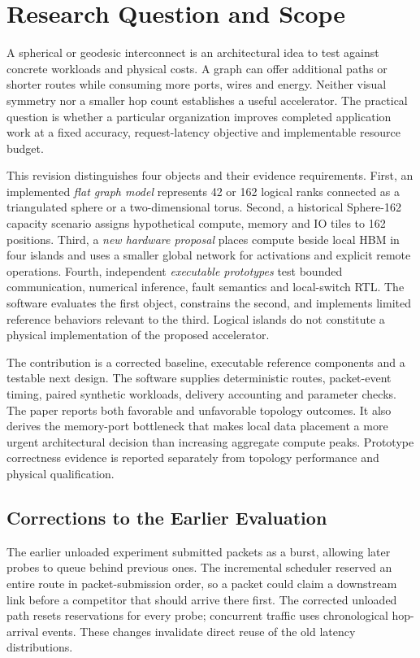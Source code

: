 \documentclass[11pt,a4paper]{article}
\begin{document}
\section{Research Question and Scope}\label{sec:scope}

A spherical or geodesic interconnect is an architectural idea to test against
concrete workloads and physical costs. A graph can offer additional paths or
shorter routes while consuming more ports, wires and energy. Neither visual
symmetry nor a smaller hop count establishes a useful accelerator. The
practical question is whether a particular organization improves completed
application work at a fixed accuracy, request-latency objective and
implementable resource budget.

This revision distinguishes four objects and their evidence requirements.
First, an implemented \emph{flat graph model} represents 42 or 162 logical
ranks connected as a triangulated sphere or a two-dimensional torus. Second,
a historical Sphere-162 capacity scenario assigns hypothetical compute,
memory and IO tiles to 162 positions. Third, a \emph{new hardware proposal}
places compute beside local HBM in four islands and uses a smaller global
network for activations and explicit remote operations. Fourth, independent
\emph{executable prototypes} test bounded communication, numerical inference,
fault semantics and local-switch RTL. The software evaluates the first object,
constrains the second, and implements limited reference behaviors relevant to
the third. Logical islands do not constitute a physical implementation of the
proposed accelerator.

The contribution is a corrected baseline, executable reference components and
a testable next design. The software supplies deterministic routes,
packet-event timing, paired
synthetic workloads, delivery accounting and parameter checks. The paper
reports both favorable and unfavorable topology outcomes. It also derives
the memory-port bottleneck that makes local data placement a more urgent
architectural decision than increasing aggregate compute peaks. Prototype
correctness evidence is reported separately from topology performance and
physical qualification.

\subsection{Corrections to the Earlier Evaluation}

The earlier unloaded experiment submitted packets as a burst, allowing later
probes to queue behind previous ones. The incremental scheduler reserved an
entire route in packet-submission order, so a packet could claim a downstream
link before a competitor that should arrive there first. The corrected
unloaded path resets reservations for every probe; concurrent traffic uses
chronological hop-arrival events. These changes invalidate direct reuse of
the old latency distributions.
\end{document}
